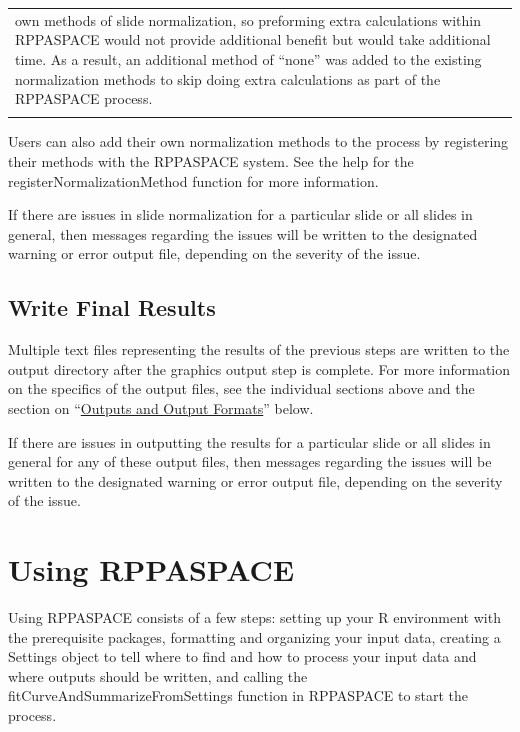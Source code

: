 \documentclass[
]{article}
\begin{document}
\begin{longtable}[]{@{}ll@{}}
\begin{minipage}[t]{0.57\columnwidth}
own methods of slide normalization, so preforming extra calculations
within RPPASPACE would not provide additional benefit but would take
additional time. As a result, an additional method of ``none'' was added
to the existing normalization methods to skip doing extra calculations
as part of the RPPASPACE process.\strut
\end{minipage}\tabularnewline
\begin{minipage}[t]{0.37\columnwidth}\raggedright
\strut
\end{minipage} & \begin{minipage}[t]{0.57\columnwidth}\raggedright
\strut
\end{minipage}\tabularnewline
\bottomrule
\end{longtable}

Users can also add their own normalization methods to the process by
registering their methods with the RPPASPACE system. See the help for
the registerNormalizationMethod function for more information.

If there are issues in slide normalization for a particular slide or all
slides in general, then messages regarding the issues will be written to
the designated warning or error output file, depending on the severity
of the issue.

\hypertarget{process_8}{%
\subsection{Write Final Results}\label{process_8}}

Multiple text files representing the results of the previous steps are
written to the output directory after the graphics output step is
complete. For more information on the specifics of the output files, see
the individual sections above and the section on
``\protect\hyperlink{outputs}{Outputs and Output Formats}'' below.

If there are issues in outputting the results for a particular slide or
all slides in general for any of these output files, then messages
regarding the issues will be written to the designated warning or error
output file, depending on the severity of the issue.

\hypertarget{using_rppaspace}{%
\section{Using RPPASPACE}\label{using_rppaspace}}

Using RPPASPACE consists of a few steps: setting up your R environment
with the prerequisite packages, formatting and organizing your input
data, creating a Settings object to tell where to find and how to
process your input data and where outputs should be written, and calling
the fitCurveAndSummarizeFromSettings function in RPPASPACE to start the
process.
\end{document}
